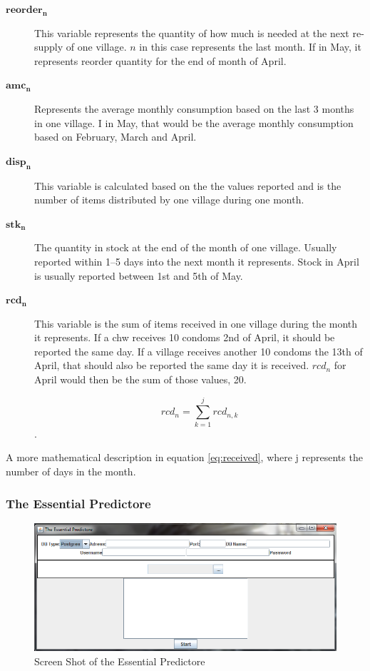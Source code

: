 \begin{description}
\item[$\mathbf{reorder_{n}}$]
This variable represents the quantity of how much is needed at the next re-supply of one village. $n$ in this case represents the last month. If in May, it represents reorder quantity for the end of month of April.
\item[$\mathbf{amc_{n}}$]
Represents the average monthly consumption based on the last 3 months in one village. I in May, that would be the average monthly consumption based on February, March and April.
\item[$\mathbf{disp_{n}}$]
This variable is calculated based on the the values reported and is the number of items distributed by one village during one month.
\item[$\mathbf{stk_{n}}$]
The quantity in stock at the end of the month of one village. Usually reported within 1--5 days into the next month it represents. Stock in April is usually reported between 1st and 5th of May.
\item[$\mathbf{rcd_{n}}$]
This variable is the sum of items received in one village during the month it represents. If a \gls{chw} receives 10 condoms 2nd of April, it should be reported the same day. If a village receives another 10 condoms the 13th of April, that should also be reported the same day it is received. $rcd_{n}$ for April would then be the sum of those values, 20.

\begin{equation}
rcd_{n} = \sum_{k = 1}^{j} rcd_{n,k}
\label{eq:received}
\end{equation}.

\end{description}



A more mathematical description in equation \ref{eq:received}, where j represents the number of days in the month.

\subsubsection{The Essential Predictore}

\begin{figure}
\centering
\includegraphics[width=\textwidth]{case/img/essentialPredictoreScreenShot}
\caption{Screen Shot of the Essential Predictore}
\label{fig:essPred}
\end{figure}

